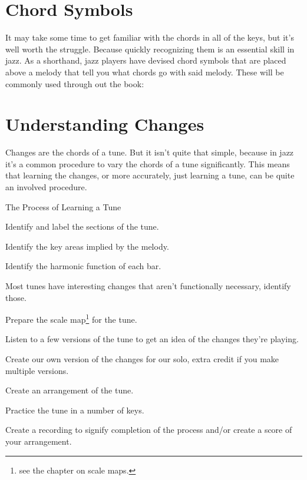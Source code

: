 \section{Chord Symbols}
It may take some time to get familiar with the chords in all of the keys, but it's well worth the struggle. Because quickly recognizing them is an essential skill in jazz. As a shorthand, jazz players have devised chord symbols that are placed above a melody that tell you what chords go with said melody. These will be commonly used through out the book:


\section{Understanding Changes}
Changes are the chords of a tune. But it isn't quite that simple, because in jazz it's a common procedure to vary the chords of a tune significantly. This means that learning the changes, or more accurately, just learning a tune, can be quite an involved procedure.

\begin{bookStyledList} {The Process of Learning a Tune}
\item Identify and label the sections of the tune.
\item Identify the key areas implied by the melody.
\item Identify the harmonic function of each bar.
\item Most tunes have interesting changes that aren't functionally necessary, identify those.
\item Prepare the scale map\footnote{see the chapter on scale maps.} for the tune.
\item Listen to a few versions of the tune to get an idea of the changes they're playing.
\item Create our own version of the changes for our solo, extra credit if you make multiple versions.
\item Create an arrangement of the tune.
\item Practice the tune in a number of keys.
\item Create a recording to signify completion of the process and/or create a score of your arrangement.
\end{bookStyledList}
